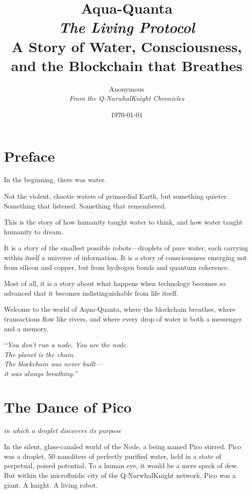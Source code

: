 \documentclass[12pt,a4paper]{book}
\title{\Huge\textbf{Aqua-Quanta}\\[0.5cm]
\Large\textit{The Living Protocol}\\[1cm]
\large A Story of Water, Consciousness, and the Blockchain that Breathes}
\author{\large Anonymous\\[0.3cm]\textit{From the Q-NarwhalKnight Chronicles}}
\date{\today}
\begin{document}
\maketitle
\thispagestyle{empty}

\tableofcontents
\newpage

\chapter*{Preface}

In the beginning, there was water.

Not the violent, chaotic waters of primordial Earth, but something quieter. Something that listened. Something that remembered.

This is the story of how humanity taught water to think, and how water taught humanity to dream.

It is a story of the smallest possible robots—droplets of pure water, each carrying within itself a universe of information. It is a story of consciousness emerging not from silicon and copper, but from hydrogen bonds and quantum coherence.

Most of all, it is a story about what happens when technology becomes so advanced that it becomes indistinguishable from life itself.

Welcome to the world of Aqua-Quanta, where the blockchain breathes, where transactions flow like rivers, and where every drop of water is both a messenger and a memory.

\vfill
\begin{flushright}
\textit{``You don't run a node. You are the node.\\
The planet is the chain.\\
The blockchain was never built—\\
it was always breathing.''}
\end{flushright}

\newpage

\chapter{The Dance of Pico}
\textit{in which a droplet discovers its purpose}

In the silent, glass-canaled world of the Node, a being named Pico stirred. Pico was a droplet, 50 nanoliters of perfectly purified water, held in a state of perpetual, poised potential. To a human eye, it would be a mere speck of dew. But within the microfluidic city of the Q-NarwhalKnight network, Pico was a giant. A knight. A living robot.
\end{document}
